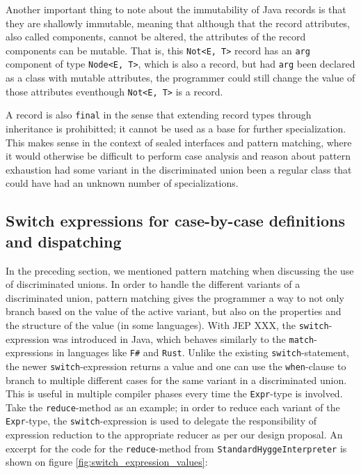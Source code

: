 Another important thing to note about the immutability of Java records is that they are shallowly immutable, meaning that although that the record
attributes, also called components, cannot be altered, the attributes of the record components can be mutable. That is, this \texttt{Not<E, T>} record
has an \texttt{arg} component of type \texttt{Node<E, T>}, which is also a record, but had \texttt{arg} been declared as a class with mutable
attributes, the programmer could still change the value of those attributes eventhough \texttt{Not<E, T>} is a record.

A record is also \texttt{final} in the sense that extending record types through inheritance is prohibitted; it cannot be used as a base for
further specialization. This makes sense in the context of sealed interfaces and pattern matching, where it would otherwise be difficult
to perform case analysis and reason about pattern exhaustion had some variant in the discriminated union been a regular class that could
have had an unknown number of specializations.

\subsection{Switch expressions for case-by-case definitions and dispatching}

In the preceding section, we mentioned pattern matching when discussing the use of discriminated unions. In order to handle the different variants
of a discriminated union, pattern matching gives the programmer a way to not only branch based on the value of the active variant, but also on
the properties and the structure of the value (in some languages). With JEP XXX, the \texttt{switch}-expression was introduced in Java, which behaves
similarly to the \texttt{match}-expressions in languages like \texttt{F\#} and \texttt{Rust}. Unlike the existing \texttt{switch}-statement,
the newer \texttt{switch}-expression returns a value and one can use the \texttt{when}-clause to branch to multiple different cases for the
same variant in a discriminated union. This is useful in multiple compiler phases every time the \texttt{Expr}-type is involved. Take
the \texttt{reduce}-method as an example; in order to reduce each variant of the \texttt{Expr}-type, the \texttt{switch}-expression is used
to delegate the responsibility of expression reduction to the appropriate reducer as per our design proposal. An excerpt for the code
for the \texttt{reduce}-method from \texttt{StandardHyggeInterpreter} is shown on figure \ref{fig:switch_expression_values}:

